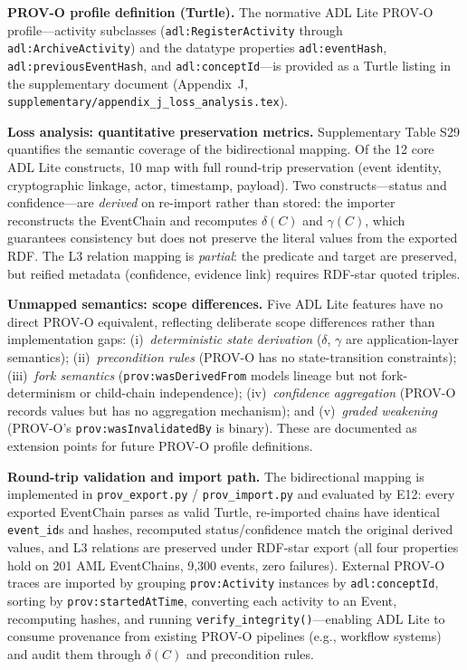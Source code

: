 \textbf{PROV-O profile definition (Turtle).} The normative ADL Lite PROV-O profile---activity subclasses (\texttt{adl:RegisterActivity} through \texttt{adl:ArchiveActivity}) and the datatype properties \texttt{adl:eventHash}, \texttt{adl:previousEventHash}, and \texttt{adl:conceptId}---is provided as a Turtle listing in the supplementary document (Appendix~J, \texttt{supplementary/appendix\_j\_loss\_analysis.tex}).

\textbf{Loss analysis: quantitative preservation metrics.} Supplementary Table S29 quantifies the semantic coverage of the bidirectional mapping. Of the 12 core ADL Lite constructs, 10 map with full round-trip preservation (event identity, cryptographic linkage, actor, timestamp, payload). Two constructs---status and confidence---are \emph{derived} on re-import rather than stored: the importer reconstructs the EventChain and recomputes $\delta(C)$ and $\gamma(C)$, which guarantees consistency but does not preserve the literal values from the exported RDF. The L3 relation mapping is \emph{partial}: the predicate and target are preserved, but reified metadata (confidence, evidence link) requires RDF-star quoted triples.

\textbf{Unmapped semantics: scope differences.} Five ADL Lite features have no direct PROV-O equivalent, reflecting deliberate scope differences rather than implementation gaps: (i)~\emph{deterministic state derivation} ($\delta$, $\gamma$ are application-layer semantics); (ii)~\emph{precondition rules} (PROV-O has no state-transition constraints); (iii)~\emph{fork semantics} (\texttt{prov:wasDerivedFrom} models lineage but not fork-determinism or child-chain independence); (iv)~\emph{confidence aggregation} (PROV-O records values but has no aggregation mechanism); and (v)~\emph{graded weakening} (PROV-O's \texttt{prov:wasInvalidatedBy} is binary). These are documented as extension points for future PROV-O profile definitions.

\textbf{Round-trip validation and import path.} The bidirectional mapping is implemented in \texttt{prov\_export.py} / \texttt{prov\_import.py} and evaluated by E12: every exported EventChain parses as valid Turtle, re-imported chains have identical \texttt{event\_id}s and hashes, recomputed status/confidence match the original derived values, and L3 relations are preserved under RDF-star export (all four properties hold on 201 AML EventChains, 9,300 events, zero failures). External PROV-O traces are imported by grouping \texttt{prov:Activity} instances by \texttt{adl:conceptId}, sorting by \texttt{prov:startedAtTime}, converting each activity to an Event, recomputing hashes, and running \texttt{verify\_integrity()}---enabling ADL Lite to consume provenance from existing PROV-O pipelines (e.g., workflow systems) and audit them through $\delta(C)$ and precondition rules.

